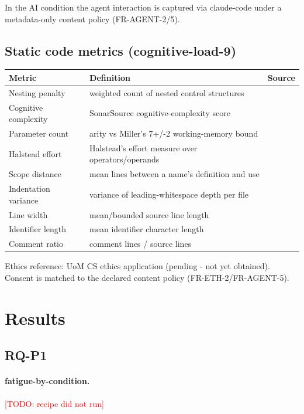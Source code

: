 \documentclass[11pt]{article}
\newcommand{\todo}[1]{\textcolor{red}{[TODO: #1]}}
\begin{document}
In the AI condition the agent interaction is captured via claude-code under a metadata-only content policy (FR-AGENT-2/5).

\subsection{Static code metrics (cognitive-load-9)}
\begin{tabular}{lll}
\toprule
Metric & Definition & Source \\
\midrule
Nesting penalty & weighted count of nested control structures & \citep{nejmeh1988} \\
Cognitive complexity & SonarSource cognitive-complexity score & \citep{campbell2018} \\
Parameter count & arity vs Miller's 7+/-2 working-memory bound & \citep{miller1956} \\
Halstead effort & Halstead's effort measure over operators/operands & \citep{halstead1977} \\
Scope distance & mean lines between a name's definition and use & \citep{nejmeh1988} \\
Indentation variance & variance of leading-whitespace depth per file & \citep{hindle2008} \\
Line width & mean/bounded source line length & \citep{hindle2008} \\
Identifier length & mean identifier character length & \citep{lawrie2006} \\
Comment ratio & comment lines / source lines & \citep{nejmeh1988} \\
\bottomrule
\end{tabular}

Ethics reference: UoM CS ethics application (pending  -  not yet obtained). Consent is matched to the declared content policy (FR-ETH-2/FR-AGENT-5).

\section{Results}

\subsection{RQ-P1}

\paragraph{fatigue-by-condition.} \todo{recipe did not run}
\end{document}
